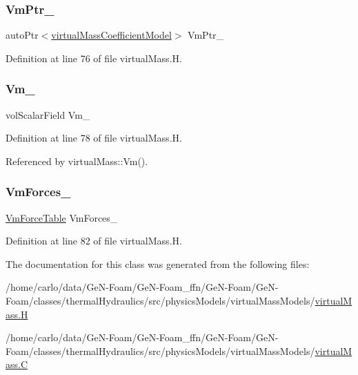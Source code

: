 \subsubsection{\texorpdfstring{Vm\+Ptr\+\_\+}{VmPtr\_}}
{\footnotesize\ttfamily auto\+Ptr$<$\hyperlink{classFoam_1_1virtualMassCoefficientModel}{virtual\+Mass\+Coefficient\+Model}$>$ Vm\+Ptr\+\_\+\hspace{0.3cm}{\ttfamily [protected]}}



Definition at line 76 of file virtual\+Mass.\+H.

\mbox{\label{classFoam_1_1virtualMass_a1a89f4eb67a364c1f685848c0bdb33de}} 
\subsubsection{\texorpdfstring{Vm\+\_\+}{Vm\_}}
{\footnotesize\ttfamily vol\+Scalar\+Field Vm\+\_\+\hspace{0.3cm}{\ttfamily [protected]}}



Definition at line 78 of file virtual\+Mass.\+H.



Referenced by virtual\+Mass\+::\+Vm().

\mbox{\label{classFoam_1_1virtualMass_ad3dbf2d6adad031bf761a4ef33246f79}} 
\subsubsection{\texorpdfstring{Vm\+Forces\+\_\+}{VmForces\_}}
{\footnotesize\ttfamily \hyperlink{classFoam_1_1virtualMass_af57d3dff5978a5ef9bc2df99473ebc19}{Vm\+Force\+Table} Vm\+Forces\+\_\+\hspace{0.3cm}{\ttfamily [protected]}}



Definition at line 82 of file virtual\+Mass.\+H.



The documentation for this class was generated from the following files\+:\begin{DoxyCompactItemize}
\item 
/home/carlo/data/\+Ge\+N-\/\+Foam/\+Ge\+N-\/\+Foam\+\_\+ffn/\+Ge\+N-\/\+Foam/\+Ge\+N-\/\+Foam/classes/thermal\+Hydraulics/src/physics\+Models/virtual\+Mass\+Models/\hyperlink{virtualMass_8H}{virtual\+Mass.\+H}\item 
/home/carlo/data/\+Ge\+N-\/\+Foam/\+Ge\+N-\/\+Foam\+\_\+ffn/\+Ge\+N-\/\+Foam/\+Ge\+N-\/\+Foam/classes/thermal\+Hydraulics/src/physics\+Models/virtual\+Mass\+Models/\hyperlink{virtualMass_8C}{virtual\+Mass.\+C}\end{DoxyCompactItemize}
